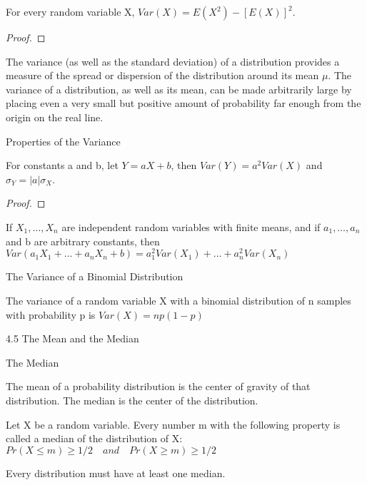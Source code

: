 \begin{proposition}
For every random variable X, $Var\left(X\right)=E\left(X^{2}\right)-\left[E\left(X\right)\right]^{2}$.
\end{proposition}
\begin{proof}
\end{proof}

{\color{red} The variance (as well as the standard deviation) of a distribution provides a measure of the spread or dispersion of the distribution around its mean $\mu$. The variance of a distribution, as well as its mean, can be made arbitrarily large by placing even a very small but positive amount of probability far enough from the origin on the real line.}

Properties of the Variance

\begin{proposition}
For constants a and b, let $Y=aX+b$, then $Var\left(Y\right)=a^{2}Var\left(X\right)$
and $\sigma_{Y}=\left|a\right|\sigma_{X}$.
\end{proposition}
\begin{proof}
\end{proof}

{\color{red} If $X_{\text{1}},\ldots,X_{n}$ are independent random variables with finite means, and if $a_{1},\ldots,a_{n}$ and b are arbitrary constants, then $Var\left(a_{1}X_{1}+\ldots+a_{n}X_{n}+b\right)=a_{1}^{2}Var\left(X_{1}\right)+\ldots+a_{n}^{2}Var\left(X_{n}\right)$}

\begin{example}
The Variance of a Binomial Distribution

The variance of a random variable X with a binomial distribution of n samples with probability p is $Var\left(X\right)=np\left(1-p\right)$
\end{example}


4.5 The Mean and the Median

The Median

{\color{red} The mean of a probability distribution is the center of gravity of that distribution. The median is the center of the distribution.}

\begin{definition}
Let X be a random variable. Every number m with the following property is called a median of the distribution of X: $Pr\left(X\leq m\right)\geq1/2\quad and\quad Pr\left(X\geq m\right)\geq1/2$
\end{definition}

{\color{red} Every distribution must have at least one median.}

